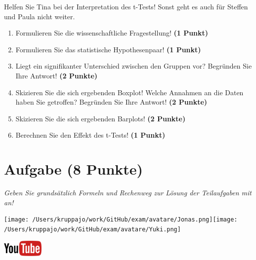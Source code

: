 \documentclass[a4paper, 9pt]{scrartcl}\usepackage[]{graphicx}\usepackage[]{xcolor}
\begin{document}
Helfen Sie Tina bei der Interpretation des t-Tests! Sonst geht es auch für Steffen und Paula nicht weiter.
  
\begin{enumerate}
  \item Formulieren Sie die wissenschaftliche Fragestellung! \textbf{(1 Punkt)}
  \item Formulieren Sie das statistische Hypothesenpaar! \textbf{(1 Punkt)}
\item Liegt ein signifikanter Unterschied zwischen den Gruppen vor?
  Begründen Sie Ihre Antwort! \textbf{(2 Punkte)}
\item Skizieren Sie die sich ergebenden Boxplot!
  Welche Annahmen an die Daten haben Sie getroffen? Begründen Sie Ihre
  Antwort! \textbf{(2 Punkte)} 
\item Skizieren Sie die sich ergebenden Barplots! \textbf{(2 Punkte)}
\item Berechnen Sie den Effekt des t-Tests! \textbf{(1 Punkt)}
\end{enumerate}
 
\clearpage

\section{Aufgabe \hfill (8 Punkte)}

\textit{Geben Sie grundsätzlich Formeln und Rechenweg zur Lösung der Teilaufgaben mit an!} \\[1Ex]
 

 
\begin{minipage}[t]{0.5\textwidth}
\texttt{[image: /Users/kruppajo/work/GitHub/exam/avatare/Jonas.png]}\hspace{-4mm}\texttt{[image: /Users/kruppajo/work/GitHub/exam/avatare/Yuki.png]}
\end{minipage}
\begin{minipage}[t]{0.5\textwidth}
\hfill
\href{https://youtu.be/kHmfEmU6lrk}{\includegraphics[width = 2cm]{img/youtube}}
\end{minipage}
\vspace{1ex}
\end{document}
